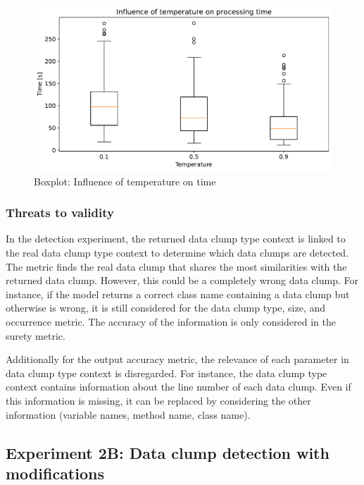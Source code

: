 \begin{figure}
    \centering
    \includegraphics[width=\columnwidth]{figures/chapter5/detect_temperature_time.pdf}
    \caption{Boxplot: Influence of temperature on time}
    \label{fig:temperature_time}
\end{figure}

\subsubsection{Threats to validity}

In the detection experiment, the returned data clump type context is linked to the real data clump type context to determine which data clumps are detected. The metric finds the real data clump that shares the most similarities with the returned data clump. However, this could be a completely wrong data clump. For instance, if the model returns a correct class name containing a data clump but otherwise is wrong, it is still considered for the data clump type, size, and occurrence metric. The accuracy of the information is only considered in the surety metric.

Additionally for the output accuracy metric, the relevance of each parameter in data clump type context is disregarded. For instance, the data clump type context contains information about the line number of each data clump. Even if this information is missing, it can be replaced by considering the other information (variable names, method name, class name). 



\subsection{Experiment 2B: Data clump detection with modifications}

